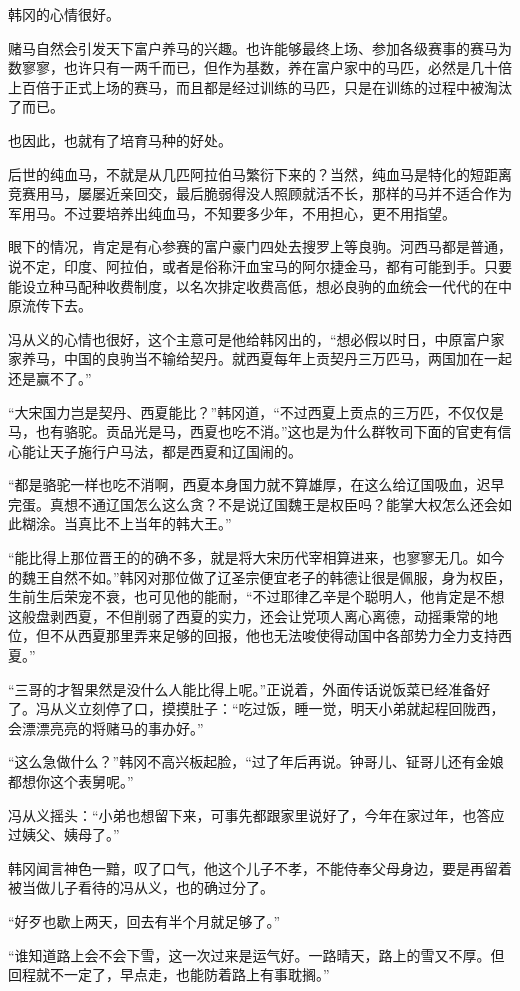 韩冈的心情很好。

赌马自然会引发天下富户养马的兴趣。也许能够最终上场、参加各级赛事的赛马为数寥寥，也许只有一两千而已，但作为基数，养在富户家中的马匹，必然是几十倍上百倍于正式上场的赛马，而且都是经过训练的马匹，只是在训练的过程中被淘汰了而已。

也因此，也就有了培育马种的好处。

后世的纯血马，不就是从几匹阿拉伯马繁衍下来的？当然，纯血马是特化的短距离竞赛用马，屡屡近亲回交，最后脆弱得没人照顾就活不长，那样的马并不适合作为军用马。不过要培养出纯血马，不知要多少年，不用担心，更不用指望。

眼下的情况，肯定是有心参赛的富户豪门四处去搜罗上等良驹。河西马都是普通，说不定，印度、阿拉伯，或者是俗称汗血宝马的阿尔捷金马，都有可能到手。只要能设立种马配种收费制度，以名次排定收费高低，想必良驹的血统会一代代的在中原流传下去。

冯从义的心情也很好，这个主意可是他给韩冈出的，“想必假以时日，中原富户家家养马，中国的良驹当不输给契丹。就西夏每年上贡契丹三万匹马，两国加在一起还是赢不了。”

“大宋国力岂是契丹、西夏能比？”韩冈道，“不过西夏上贡点的三万匹，不仅仅是马，也有骆驼。贡品光是马，西夏也吃不消。”这也是为什么群牧司下面的官吏有信心能让天子施行户马法，都是西夏和辽国闹的。

“都是骆驼一样也吃不消啊，西夏本身国力就不算雄厚，在这么给辽国吸血，迟早完蛋。真想不通辽国怎么这么贪？不是说辽国魏王是权臣吗？能掌大权怎么还会如此糊涂。当真比不上当年的韩大王。”

“能比得上那位晋王的的确不多，就是将大宋历代宰相算进来，也寥寥无几。如今的魏王自然不如。”韩冈对那位做了辽圣宗便宜老子的韩德让很是佩服，身为权臣，生前生后荣宠不衰，也可见他的能耐，“不过耶律乙辛是个聪明人，他肯定是不想这般盘剥西夏，不但削弱了西夏的实力，还会让党项人离心离德，动摇秉常的地位，但不从西夏那里弄来足够的回报，他也无法唆使得动国中各部势力全力支持西夏。”

“三哥的才智果然是没什么人能比得上呢。”正说着，外面传话说饭菜已经准备好了。冯从义立刻停了口，摸摸肚子：“吃过饭，睡一觉，明天小弟就起程回陇西，会漂漂亮亮的将赌马的事办好。”

“这么急做什么？”韩冈不高兴板起脸，“过了年后再说。钟哥儿、钲哥儿还有金娘都想你这个表舅呢。”

冯从义摇头：“小弟也想留下来，可事先都跟家里说好了，今年在家过年，也答应过姨父、姨母了。”

韩冈闻言神色一黯，叹了口气，他这个儿子不孝，不能侍奉父母身边，要是再留着被当做儿子看待的冯从义，也的确过分了。

“好歹也歇上两天，回去有半个月就足够了。”

“谁知道路上会不会下雪，这一次过来是运气好。一路晴天，路上的雪又不厚。但回程就不一定了，早点走，也能防着路上有事耽搁。”

